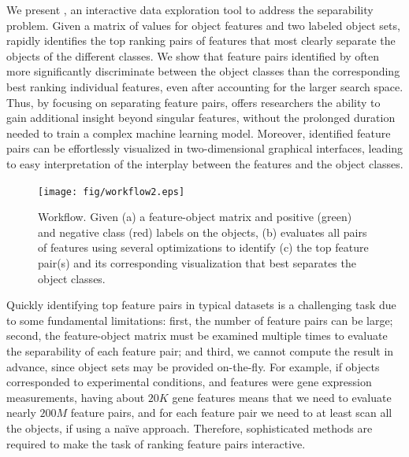 We present \genviz,
an interactive data exploration tool to address the separability problem.
Given a matrix of values for object features
and two labeled object sets, \genviz rapidly identifies
the top ranking pairs of features
that most clearly separate the objects of
the different classes.
We show that feature pairs identified by \genviz often more significantly
discriminate between the object classes than the corresponding
best ranking individual features, even after accounting for the larger search space.
Thus, by focusing on separating feature pairs, \genviz
offers researchers the ability to gain additional
insight beyond singular features, without the prolonged duration
needed to train a complex machine learning model.
Moreover, identified feature pairs can be effortlessly
visualized in two-dimensional graphical interfaces,
leading to easy interpretation of
the interplay between the features and the object classes.

\begin{figure}[t]
 \centering
 \texttt{[image: fig/workflow2.eps]}
 \vspace{-15pt}
\caption{\genviz Workflow.
Given (a) a feature-object matrix and positive (green) and negative class (red) labels on the objects, \genviz (b) evaluates all pairs of features using several optimizations to identify (c) the top feature pair(s) and its corresponding visualization that best separates the object classes.}
\label{fig:workflow}
\vspace{-15pt}
\end{figure}

Quickly identifying top feature pairs
in typical datasets
is a challenging task due to some fundamental limitations:
first, the number of feature pairs can be large;
second, the feature-object matrix must be examined
multiple times to evaluate the separability of
each feature pair;
and third, we cannot compute the result in advance, since
object sets may be provided on-the-fly.
For example, if objects corresponded to experimental
conditions, and features were gene expression measurements,
having about $20K$ gene features
means that we need to evaluate nearly $200M$ feature pairs,
and for each feature pair we need to at least scan all the objects, if using a na\"ive approach.
Therefore, sophisticated methods are required
to make the task of ranking feature pairs interactive.

